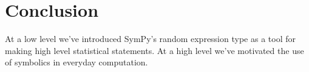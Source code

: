 \section{Conclusion}
At a low level we've introduced SymPy's random expression type as a tool for making high level statistical statements. At a high level we've motivated the use of symbolics in everyday computation.

